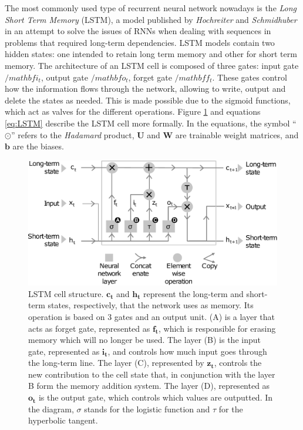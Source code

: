 The most commonly used type of recurrent neural network nowadays is the \textit{Long Short Term Memory} (LSTM), a model published by  \textit{Hochreiter} and \textit{Schmidhuber} \autocite{Schmidhuber1997} in an attempt to solve the issues of RNNs when dealing with sequences in problems that required long-term dependencies. LSTM models contain two hidden states: one intended to retain long term memory and other for short term memory. The architecture of an LSTM cell is composed of three gates: input gate $/mathbf{i_t}$, output gate $/mathbf{o_t}$, forget gate $/mathbf{f_t}$. These gates control how the information flows through the network, allowing to write, output and delete the states as needed. This is made possible due to the sigmoid functions, which act as valves for the different operations. Figure \ref{fig:lstm} and equations \ref{eq:LSTM} describe the LSTM cell more formally. In the equations, the symbol ``$\odot$'' refers to the \textit{Hadamard} product, $\mathbf{U}$ and $\mathbf{W}$ are trainable weight matrices, and $\mathbf{b}$ are the biases.

\begin{figure}
	\centering
	\includegraphics[width=0.7\linewidth]{chapter2/images/LSTM}
	\caption{LSTM cell structure. $\mathbf{c_t}$ and $\mathbf{h_t}$ represent the long-term and short-term states, respectively, that the network uses as memory. Its operation is based on 3 gates and an output unit. (A) is a layer that acts as forget gate, represented as $\mathbf{f_t}$, which is responsible for erasing memory which will no longer be used. The layer (B) is the input gate, represented as $\mathbf{i_t}$, and controls how much input goes through the long-term line. The layer (C), represented by $\mathbf{z_t}$, controls the new contribution to the cell state that, in conjunction with the layer B form the memory addition system. The layer (D), represented as $\mathbf{o_t}$ is the output gate, which controls which values are outputted. In the diagram, $\sigma$ stands for the logistic function and $\tau$ for the hyperbolic tangent.}
	\label{fig:lstm}
\end{figure}



